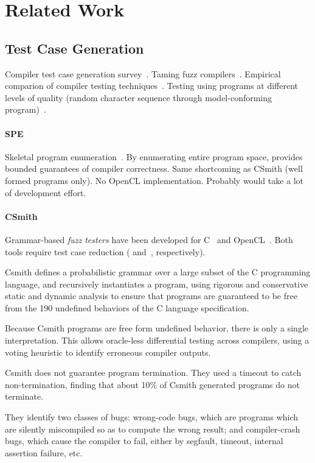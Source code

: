 \section{Related Work}\label{sec:rw}

\subsection{Test Case Generation}

 Compiler test case generation survey~\cite{Boujarwah1997}. Taming fuzz compilers~\cite{Chen2013}. Empirical comparion of compiler testing techniques~\cite{Chen2014a}. Testing using programs at different levels of quality (random character sequence through model-conforming program)~\cite{McKeeman1998}.

\paragraph{SPE} Skeletal program enumeration~\cite{Zhang2016a}. By enumerating entire program space, provides bounded guarantees of compiler correctness. Same shortcoming as CSmith (well formed programs only). No OpenCL implementation. Probably would take a lot of development effort. 

\paragraph{CSmith} Grammar-based \emph{fuzz testers} have been developed for C~\cite{Yang2011} and OpenCL~\cite{Lidbury2015a}. Both tools require test case reduction (\cite{Regehr2012a} and~\cite{Pflanzer2016}, respectively).

Csmith defines a probabilistic grammar over a large subset of the C programming language, and recursively instantiates a program, using rigorous and conservative static and dynamic analysis to ensure that programs are guaranteed to be free from the 190 undefined behaviors of the C language specification.

Because Csmith programs are free form undefined behavior, there is only a single interpretation. This allows oracle-less differential testing across compilers, using a voting heuristic to identify erroneous compiler outputs.

Csmith does not guarantee program termination. They used a timeout to catch non-termination, finding that about 10\% of Csmith generated programs do not terminate.

They identify two classes of bugs: wrong-code bugs, which are programs which are silently miscompiled so as to compute the wrong result; and compiler-crash bugs, which cause the compiler to fail, either by segfault, timeout, internal assertion failure, etc.

